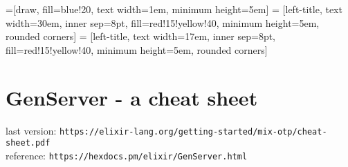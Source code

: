 \documentclass[a4paper]{article}
\def\parchmentframe#1{
\tikz{
  \node[inner sep=2em] (A) {#1};  %
  \begin{pgfonlayer}{background}  %
  \filldraw[normal border,rounded corners=2em,color=blue!10!yellow!5,draw=blue!25!yellow,dashed]
        (A.south east) -- (A.south west) --
        (A.north west) -- (A.north east) -- cycle;
  \end{pgfonlayer}}}
\def\parchmentframetop#1{
\tikz{
  \node[inner sep=2em] (A) {#1};    %
  \begin{pgfonlayer}{background}
  \filldraw[normal border,rounded corners,color=blue!10!yellow!5,draw=blue!25!yellow,dashed]
        (A.south east) -- (A.south west) --
        (A.north west) -- (A.north east) -- cycle;
  \end{pgfonlayer}}}
\def\parchmentframebottom#1{
\tikz{
  \node[inner sep=2em] (A) {#1};   %
  \begin{pgfonlayer}{background}
  \filldraw[normal border,rounded corners,color=blue!10!yellow!5,draw=blue!25!yellow,dashed]
        (A.south east) -- (A.south west) --
        (A.north west) -- (A.north east) -- cycle;
  \end{pgfonlayer}}}
\def\parchmentframemiddle#1{
\tikz{
  \node[inner sep=2em] (A) {#1};   %
  \begin{pgfonlayer}{background}
  \filldraw[normal border,rounded corners,color=blue!10!yellow!5,draw=blue!25!yellow,dashed]
        (A.south east) -- (A.south west) --
        (A.north west) -- (A.north east) -- cycle;
  \end{pgfonlayer}}}
\newenvironment{parchment}[1][Example]{%
  \def\FrameCommand{\parchmentframe}%
  \def\FirstFrameCommand{\parchmentframetop}%
  \def\LastFrameCommand{\parchmentframebottom}%
  \def\MidFrameCommand{\parchmentframemiddle}%
  \vskip\baselineskip
  \MakeFramed {\FrameRestore}
  \noindent\tikz\node[rounded corners=2ex, inner sep=2ex, draw=blue!25!yellow, fill=white, dashed, anchor=west, overlay] at (0em, 2em) {\sffamily#1};\par}%
{\endMakeFramed}
\begin{document}

=[draw, fill=blue!20, text width=1em, minimum height=5em]
 = [left-title, text width=30em, inner sep=8pt, fill=red!15!yellow!40, minimum height=5em, rounded corners]
 = [left-title, text width=17em, inner sep=8pt, fill=red!15!yellow!40, minimum height=5em, rounded corners]

\begin{comment}
\begin{parchment}[commentarii de bello gallico]
  Gallia est omnis divisa in partes tres, quarum unam incolunt Belgae, aliam Aquitani, tertiam qui ipsorum lingua Celtae, nostra Galli appellantur. Hi omnes lingua, institutis, legibus inter se differunt. Gallos ab Aquitanis Garumna flumen, a Belgis Matrona et Sequana dividit. Horum omnium fortissimi sunt Belgae, propterea quod a cultu atque humanitate provinciae longissime absunt, minimeque ad eos mercatores saepe commeant atque ea quae ad effeminandos animos pertinent important, proximique sunt Germanis, qui trans Rhenum incolunt, quibuscum continenter bellum gerunt. Qua de causa Helvetii quoque reliquos Gallos virtute praecedunt, quod fere cotidianis proeliis cum Germanis contendunt, cum aut suis finibus eos prohibent aut ipsi in eorum finibus bellum gerunt. Eorum una pars, quam Gallos obtinere dictum est, initium capit a flumine Rhodano, continetur Garumna flumine, Oceano, finibus Belgarum, attingit etiam ab Sequanis et Helvetiis flumen Rhenum, vergit ad septentriones. Belgae ab extremis Galliae finibus oriuntur, pertinent ad inferiorem partem fluminis Rheni, spectant in septentrionem et orientem solem. Aquitania a Garumna flumine ad Pyrenaeos montes et eam partem Oceani quae est ad Hispaniam pertinet; spectat inter occasum solis et septentriones.
\end{parchment}
\end{comment}
\section*{GenServer - a cheat sheet}
last version: \verb|https://elixir-lang.org/getting-started/mix-otp/cheat-sheet.pdf|\\
reference: \verb|https://hexdocs.pm/elixir/GenServer.html|
\end{document}
